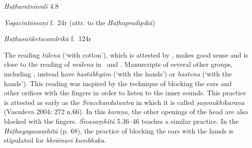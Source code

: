 \begin{ekdosis}

\begin{testimonia}[hp04_035]
\emph{Haṭharatnāvalī} 4.8
\begin{versinnote}
\end{versinnote}

\emph{Yogacintāmaṇi} f.~24r (attr. to the \emph{Haṭhapradīpikā})
\begin{versinnote}
\end{versinnote}

\emph{Haṭhasaṅketacandrikā} f.~124r
\begin{versinnote}
\end{versinnote}
\end{testimonia}

\begin{philcomm}[hp04_035]
%

The reading \emph{tūlena} (`with cotton'), which is attested by \alphaThree, makes good sense and is close to the reading of \emph{mūlena} in \alphaOne\ and \alphaTwo. Manuscripts of several other groups, including \textgamma, instead have \emph{hastābhyām} (`with the hands') or \emph{hastena} (`with the hands'). This reading was inspired by the technique of blocking the ears and other orifices with the fingers in order to listen to the inner sounds. This practice is attested as early as the \textit{Svacchandatantra} in which it is called \textit{ṣaṇmukhīkaraṇa} (Vasudeva 2004: 272 n.66). In this \emph{karaṇa}, the other openings of the head are also blocked with the fingers. \emph{Śivasaṃhitā} 5.36–46 teaches a similar practice. In the \textit{Haṭhayogasaṃhitā} (p. 68), the practice of blocking the ears with the hands is stipulated for \textit{bhrāmarī kumbhaka}.
\end{philcomm}


\end{ekdosis}
